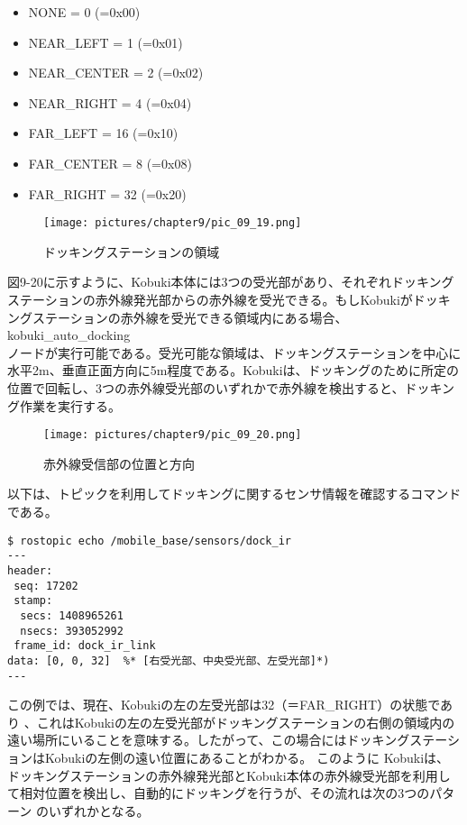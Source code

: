 \begin{itemize}[leftmargin=*]
\item NONE = 0  (=0x00)
\item NEAR\_LEFT = 1 (=0x01)
\item NEAR\_CENTER = 2 (=0x02)
\item NEAR\_RIGHT = 4 (=0x04)
\item FAR\_LEFT = 16 (=0x10)
\item FAR\_CENTER = 8 (=0x08)
\item FAR\_RIGHT = 32 (=0x20)
\end{itemize}

\begin{figure}[htp]
  \centering
  \texttt{[image: pictures/chapter9/pic\_09\_19.png]}
  \caption{ドッキングステーションの領域}
\end{figure}

図9-20に示すように、Kobuki本体には3つの受光部があり、それぞれドッキングステーションの赤外線発光部からの赤外線を受光できる。もしKobukiがドッキングステーションの赤外線を受光できる領域内にある場合、kobuki\_auto\_docking\\ノードが実行可能である。受光可能な領域は、ドッキングステーションを中心に水平2m、垂直正面方向に5m程度である。Kobukiは、ドッキングのために所定の位置で回転し、3つの赤外線受光部のいずれかで赤外線を検出すると、ドッキング作業を実行する。

\begin{figure}[htp]
  \centering
  \texttt{[image: pictures/chapter9/pic\_09\_20.png]}
  \caption{赤外線受信部の位置と方向}
\end{figure}

以下は、トピックを利用してドッキングに関するセンサ情報を確認するコマンドである。

\begin{lstlisting}[language=ROS]
$ rostopic echo /mobile_base/sensors/dock_ir
---
header:
 seq: 17202
 stamp:
  secs: 1408965261
  nsecs: 393052992
 frame_id: dock_ir_link
data: [0, 0, 32]  %* [右受光部、中央受光部、左受光部]*)
---
\end{lstlisting}

この例では、現在、Kobukiの左の左受光部は32（＝FAR\_RIGHT）の状態であり  、これはKobukiの左の左受光部がドッキングステーションの右側の領域内の遠い場所にいることを意味する。したがって、この場合にはドッキングステーションはKobukiの左側の遠い位置にあることがわかる。
このように  Kobukiは、ドッキングステーションの赤外線発光部とKobuki本体の赤外線受光部を利用して相対位置を検出し、自動的にドッキングを行うが、その流れは次の3つのパターン   のいずれかとなる。

